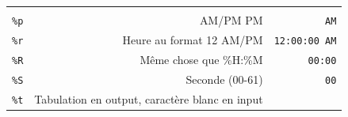 \documentclass[12pt,]{book}
\numberwithin{equation}{section}
\numberwithin{countremarque}{section}
\begin{document}
\begin{longtable}[]{@{}rrr@{}}
\begin{minipage}[t]{0.22\columnwidth}
\end{minipage}\tabularnewline
\begin{minipage}[t]{0.10\columnwidth}\raggedleft\strut
\texttt{\%p}\strut
\end{minipage} & \begin{minipage}[t]{0.60\columnwidth}\raggedleft\strut
AM/PM PM\strut
\end{minipage} & \begin{minipage}[t]{0.22\columnwidth}\raggedleft\strut
\texttt{AM}\strut
\end{minipage}\tabularnewline
\begin{minipage}[t]{0.10\columnwidth}\raggedleft\strut
\texttt{\%r}\strut
\end{minipage} & \begin{minipage}[t]{0.60\columnwidth}\raggedleft\strut
Heure au format 12 AM/PM\strut
\end{minipage} & \begin{minipage}[t]{0.22\columnwidth}\raggedleft\strut
\texttt{12:00:00\ AM}\strut
\end{minipage}\tabularnewline
\begin{minipage}[t]{0.10\columnwidth}\raggedleft\strut
\texttt{\%R}\strut
\end{minipage} & \begin{minipage}[t]{0.60\columnwidth}\raggedleft\strut
Même chose que \%H:\%M\strut
\end{minipage} & \begin{minipage}[t]{0.22\columnwidth}\raggedleft\strut
\texttt{00:00}\strut
\end{minipage}\tabularnewline
\begin{minipage}[t]{0.10\columnwidth}\raggedleft\strut
\texttt{\%S}\strut
\end{minipage} & \begin{minipage}[t]{0.60\columnwidth}\raggedleft\strut
Seconde (00-61)\strut
\end{minipage} & \begin{minipage}[t]{0.22\columnwidth}\raggedleft\strut
\texttt{00}\strut
\end{minipage}\tabularnewline
\begin{minipage}[t]{0.10\columnwidth}\raggedleft\strut
\texttt{\%t}\strut
\end{minipage} & \begin{minipage}[t]{0.60\columnwidth}\raggedleft\strut
Tabulation en output, caractère blanc en input\strut
\end{minipage} & \begin{minipage}[t]{0.22\columnwidth}\raggedleft\strut

\end{minipage}
\end{longtable}
\end{document}
